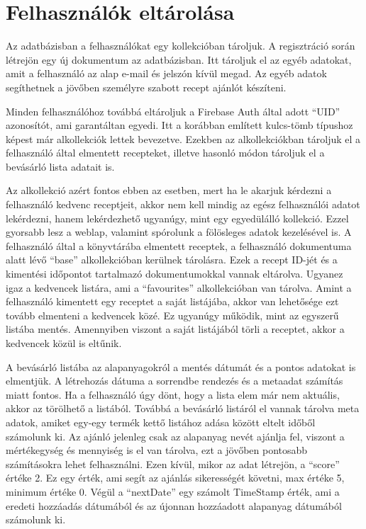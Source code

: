 \documentclass[12pt]{report}
\theoremstyle{definition}
\begin{document}
\section{Felhasználók eltárolása}
Az adatbázisban a felhasználókat egy kollekcióban tároljuk. A regisztráció során létrejön egy új dokumentum az adatbázisban. Itt tároljuk el az egyéb adatokat, amit a felhasználó az alap e-mail és jelszón kívül megad. Az egyéb adatok segíthetnek a jövőben személyre szabott recept ajánlót készíteni. 

Minden felhasználóhoz továbbá eltároljuk a Firebase Auth által adott “UID” azonosítót, ami garantáltan egyedi. Itt a korábban említett kulcs-tömb típushoz képest már alkollekciók lettek bevezetve. Ezekben az alkollekciókban tároljuk el a felhasználó által elmentett recepteket, illetve hasonló módon tároljuk el a bevásárló lista adatait is.

Az alkollekció azért fontos ebben az esetben, mert ha le akarjuk kérdezni a felhasználó kedvenc receptjeit, akkor nem kell mindig az egész felhasználói adatot lekérdezni, hanem lekérdezhető ugyanúgy, mint egy egyedülálló kollekció. Ezzel gyorsabb lesz a weblap, valamint spórolunk a fölösleges adatok kezelésével is. A felhasználó által a könyvtárába elmentett receptek, a felhasználó dokumentuma alatt lévő “base” alkollekcióban kerülnek tárolásra. Ezek a recept ID-jét és a kimentési időpontot tartalmazó dokumentumokkal vannak eltárolva. Ugyanez igaz a kedvencek listára, ami a  “favourites” alkollekcióban van tárolva. Amint a felhasználó kimentett egy receptet a saját listájába, akkor van lehetősége ezt tovább elmenteni a kedvencek közé. Ez ugyanúgy működik, mint az egyszerű listába mentés. Amennyiben viszont a saját listájából törli a receptet, akkor a kedvencek közül is eltűnik. 

A bevásárló listába az alapanyagokról a mentés dátumát és a pontos adatokat is elmentjük. A létrehozás dátuma a sorrendbe rendezés és a metaadat számítás miatt fontos. Ha a felhasználó úgy dönt, hogy a lista elem már nem aktuális, akkor az törölhető a listából. Továbbá a bevásárló listáról el vannak tárolva meta adatok, amiket egy-egy termék kettő listához adása között eltelt időből számolunk ki. Az ajánló jelenleg csak az alapanyag nevét ajánlja fel, viszont a mértékegység és mennyiség is el van tárolva, ezt a jövőben pontosabb számításokra lehet felhasználni. Ezen kívül, mikor az adat létrejön, a “score” értéke 2. Ez egy érték, ami segít az ajánlás sikerességét követni, max értéke 5, minimum értéke 0. Végül a “nextDate” egy számolt TimeStamp érték, ami a eredeti hozzáadás dátumából és az újonnan hozzáadott alapanyag dátumából számolunk ki.
\end{document}
